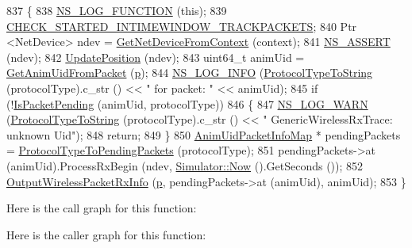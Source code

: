 \begin{DoxyCode}
837 \{
838   \hyperlink{log-macros-disabled_8h_a90b90d5bad1f39cb1b64923ea94c0761}{NS\_LOG\_FUNCTION} (\textcolor{keyword}{this});
839   \hyperlink{animation-interface_8h_acdf351a3155a6ccf1813189e10dba8f5}{CHECK\_STARTED\_INTIMEWINDOW\_TRACKPACKETS};
840   Ptr <NetDevice> ndev = \hyperlink{classns3_1_1AnimationInterface_a5054e94f0c5e3d0a4443cfbe52e2ea30}{GetNetDeviceFromContext} (context);
841   \hyperlink{assert_8h_a6dccdb0de9b252f60088ce281c49d052}{NS\_ASSERT} (ndev);
842   \hyperlink{classns3_1_1AnimationInterface_ab751cf6f459289f0978f4bb97b93044d}{UpdatePosition} (ndev);
843   uint64\_t animUid = \hyperlink{classns3_1_1AnimationInterface_a18e6a184ccd7dee800bf734f8adc818c}{GetAnimUidFromPacket} (\hyperlink{lte__link__budget_8m_ac9de518908a968428863f829398a4e62}{p});
844   \hyperlink{group__logging_gafbd73ee2cf9f26b319f49086d8e860fb}{NS\_LOG\_INFO} (\hyperlink{classns3_1_1AnimationInterface_a1b901b34acadaa3c35433083d542dd19}{ProtocolTypeToString} (protocolType).c\_str () << \textcolor{stringliteral}{" for packet:
      "} << animUid);
845   \textcolor{keywordflow}{if} (!\hyperlink{classns3_1_1AnimationInterface_a0bee27aa30e136d5035050ec2ef0012d}{IsPacketPending} (animUid, protocolType))
846     \{
847       \hyperlink{group__logging_gade7208b4009cdf0e25783cd26766f559}{NS\_LOG\_WARN} (\hyperlink{classns3_1_1AnimationInterface_a1b901b34acadaa3c35433083d542dd19}{ProtocolTypeToString} (protocolType).c\_str () << \textcolor{stringliteral}{"
       GenericWirelessRxTrace: unknown Uid"});
848       \textcolor{keywordflow}{return};
849     \}
850   \hyperlink{classns3_1_1AnimationInterface_afea577896009c4134df836bc20f1eabe}{AnimUidPacketInfoMap} * pendingPackets =  
      \hyperlink{classns3_1_1AnimationInterface_a3785f870e7f29eb0ea0b843327fad5bb}{ProtocolTypeToPendingPackets} (protocolType); 
851   pendingPackets->at (animUid).ProcessRxBegin (ndev, \hyperlink{classns3_1_1Simulator_ac3178fa975b419f7875e7105be122800}{Simulator::Now} ().GetSeconds ());
852   \hyperlink{classns3_1_1AnimationInterface_ae7dbb6c566787d3444e3fcba367e5338}{OutputWirelessPacketRxInfo} (\hyperlink{lte__link__budget_8m_ac9de518908a968428863f829398a4e62}{p}, pendingPackets->at (animUid), animUid);
853 \}
\end{DoxyCode}


Here is the call graph for this function\+:




Here is the caller graph for this function\+:


